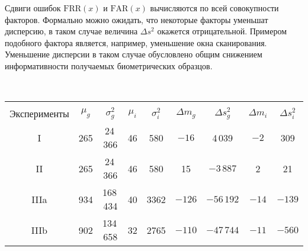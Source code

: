\begin{multicols}{2}
     Сдвиги ошибок $\mathrm{FRR}(x)$ и $\mathrm{FAR}(x)$ вычисляются по всей 
совокупности факторов. Формально можно ожидать, что некоторые факторы уменьшат 
дис\-пер\-сию, в таком случае величина $\Delta s^2$ окажется отрицательной. Примером 
подобного фактора является, например, уменьшение окна сканирования. Уменьшение 
дисперсии в таком случае обусловлено общим снижением информативности 
получаемых биометрических образцов.

\begin{figure*} %
\vspace*{1pt}
\begin{center}
\vspace*{1pt}
\mbox{%
\epsfxsize=161.708mm
}
\end{center}
\vspace*{-9pt}
\end{figure*}

\begin{table*}\small %
\begin{center}
\vspace*{2ex}

\begin{tabular}{|c|c|c|c|c|c|c|c|c|}
\hline
&&&&&&&&\\[-8pt]
\multicolumn{1}{|c|}{Эксперименты}&$\mu_g$ &$\sigma_g^2$&$\mu_i$
&$\sigma_i^2$&$\Delta m_g$&$\Delta s_g^2$&$\Delta m_i$&$\Delta s_i^2$\\
\hline
I&265&24\,366&46&580&$-16$&\hphantom{$-$}4\,039&$-2$&\hphantom{$-$}309\\
II&265&24\,366&46&580&\hphantom{$-$}15&$-3\,887$&\hphantom{$-$}2&\hphantom{$-9$}21\\
IIIa&934&168\,434\hphantom{9}&40&3362\hphantom{9}&$-126$\hphantom{9}&$-56\,192$\hphantom{9}&$-14$\hphantom{9}&$-139$\\
IIIb&902&134\,658\hphantom{9}&32&2765\hphantom{9}&$-110$\hphantom{9}&$-47\,744$\hphantom{9}&$-11$\hphantom{9}&$-560$\\
\hline
\end{tabular}
\end{center}
\end{table*}
     

\end{multicols}
